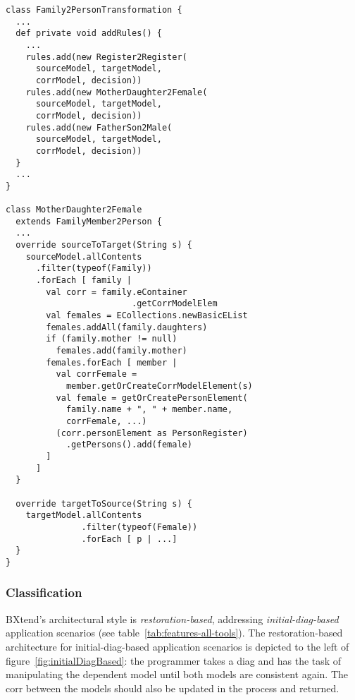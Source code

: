 
\begin{lstlisting}[label={lst:bxtendSoln}, float=htb!, language=bxtend, caption={Rule orchestration and a specific rule with BXtend}]
class Family2PersonTransformation {
  ...
  def private void addRules() {
    ...
    rules.add(new Register2Register(
      sourceModel, targetModel, 
      corrModel, decision))
    rules.add(new MotherDaughter2Female(
      sourceModel, targetModel, 
      corrModel, decision))
    rules.add(new FatherSon2Male(
      sourceModel, targetModel, 
      corrModel, decision))
  }
  ...
}

class MotherDaughter2Female 
  extends FamilyMember2Person {
  ...
  override sourceToTarget(String s) {  
    sourceModel.allContents
      .filter(typeof(Family))
      .forEach [ family |
        val corr = family.eContainer
                         .getCorrModelElem
        val females = ECollections.newBasicEList
        females.addAll(family.daughters)
        if (family.mother != null) 
          females.add(family.mother)
        females.forEach [ member |
          val corrFemale = 
            member.getOrCreateCorrModelElement(s)
          val female = getOrCreatePersonElement(
	        family.name + ", " + member.name, 
	        corrFemale, ...)
          (corr.personElement as PersonRegister)
            .getPersons().add(female)
        ]
      ]
  }

  override targetToSource(String s) {
    targetModel.allContents
               .filter(typeof(Female))
               .forEach [ p | ...]
  }
}
\end{lstlisting}




\subsubsection{Classification}

BXtend's architectural style is \emph{restoration-based}, addressing \emph{initial-diag-based} application scenarios (see table~\ref{tab:features-all-tools}).
The re\-storation-based architecture for initial-diag-based application scenarios is depicted to the left of figure~\ref{fig:initialDiagBased}:  the programmer takes a diag and has the task of manipulating the dependent model until both models are consistent again.
The corr between the models should also be updated in the process and returned.

